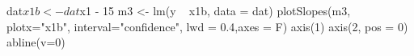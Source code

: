 \begin{Schunk}
\begin{Sinput}
 dat$x1b <- dat$x1 - 15
 m3 <- lm(y ~ x1b, data = dat)
 plotSlopes(m3, plotx="x1b", interval="confidence", lwd = 0.4,axes = F)
 axis(1)
 axis(2, pos = 0)
 abline(v=0)
\end{Sinput}
\end{Schunk}
